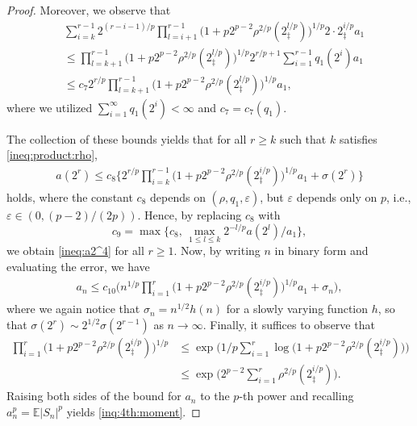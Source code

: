 \documentclass[11pt,a4,leqno]{amsart}
\newcommand{\vep}{\varepsilon}
\newcommand{\E }{{\mathbb E}}
\newcommand{\1}{{\mathbf 1}}
\begin{document}
\begin{proof}
Moreover, we observe that 
\begin{align*}
& \sum_{i=k}^{r-1} 2^{(r-i-1)/p} \prod_{l=i+1}^{r-1} 
\big(1+p 2^{p-2}\rho^{2/p}(2^{l/p}_\ddag )\big)^{1/p} 2 \cdot 2^{i/p}_\ddag a_1 \\
& \le  \prod_{l=k+1}^{r-1} \big(
1+p 2^{p-2} \rho^{2/p}(2^{l/p}_\ddag)
\big)^{1/p} 2^{r/p+1} \sum_{i=1}^{r-1} q_1 (2^i) a_1 \\
& \le  c_7 2^{r/p} \prod_{l=k+1}^{r-1} \big(
1+p 2^{p-2} \rho^{2/p}(2^{l/p}_\ddag)
\big)^{1/p}a_1,
\end{align*}
where we utilized $\sum_{i=1}^\infty q_1(2^i)<\infty$ and $c_7=c_7(q_1)$.  

The collection of these bounds yields that for all $r\ge k$ such that $k$ satisfies \eqref{ineq:product:rho},  
\begin{align}
\label{ineq:a2^4}
 a(2^r) \le c_8 \bigg\{
2^{r/p} \prod_{i=k}^{r-1}\big(
1+p 2^{p-2} \rho^{2/p}(2_\ddag^{i/p}) \big)^{1/p} a_1 + \sigma(2^r)
\bigg\} 
\end{align}
holds, where the constant $c_8$ depends on $(\rho,q_1,\vep)$, but $\vep$ depends only on $p$, i.e., $\vep \in (0,(p-2)/(2p))$. 
Hence, by replacing $c_8$ with 
\[
 c_9= \max \big\{ c_8,\,\max_{1\le l \le k} 2^{-l/p} a(2^l) / a_1 \big\},
\]
we obtain \eqref{ineq:a2^4} for all $r\ge 1$. 
Now, by writing $n$ in binary form and evaluating the error, we have 
\begin{align*}
 a_n \le c_{10} \bigg(n^{1/p} \prod_{i=1}^r \big(
1+p2^{p-2} \rho^{2/p}(2_\ddag^{i/p})
\big)^{1/p}a_1 +\sigma_n \bigg), 
\end{align*}
where we again notice that $\sigma_n=n^{1/2}h(n)$ for a slowly varying function $h$, so that 
$\sigma(2^r) \sim 2^{1/2} \sigma(2^{r-1})$ as $n\to\infty$.  
Finally, it suffices to observe that 
\begin{align*}
\prod_{i=1}^r \big(
1+ p2^{p-2} \rho^{2/p}(2^{i/p}_\ddag)
\big)^{1/p} & \le \exp\bigg( 1/p \sum_{i=1}^r \log \big(1+ p2^{p-2} \rho^{2/p}(2_\ddag^{i/p})\big) \bigg) \\
& \le \exp\big( 2^{p-2} \sum_{i=1}^r \rho^{2/p}(2^{i/p}_\ddag) \big).  
\end{align*}
Raising both sides of the bound for $a_n$ to the $p$-th power and recalling $a_n^p = \E|S_n|^p$ yields \eqref{inq:4th:moment}.
\end{proof}
\end{document}
